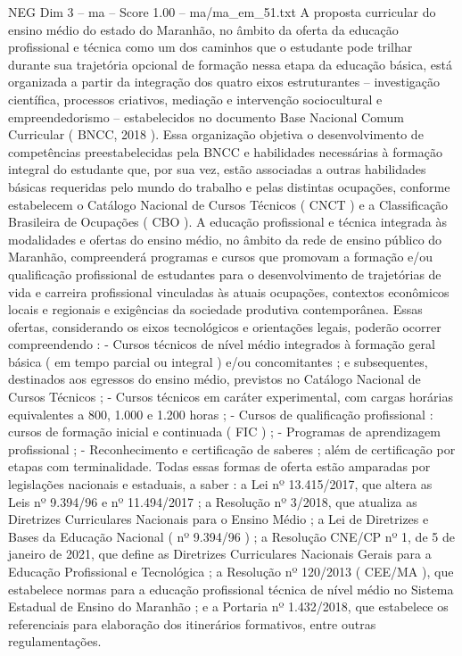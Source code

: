 \begin{textsample}{NEG Dim 3 – ma – Score 1.00 – ma/ma\_em\_51.txt}
A proposta curricular do ensino médio do estado do Maranhão, no âmbito da oferta da educação profissional e técnica como um dos caminhos que o estudante pode trilhar durante sua trajetória opcional de formação nessa etapa da educação básica, está organizada a partir da integração dos quatro eixos estruturantes – investigação científica, processos criativos, mediação e intervenção sociocultural e empreendedorismo – estabelecidos no documento Base Nacional Comum Curricular ( BNCC, 2018 ).
Essa organização objetiva o desenvolvimento de competências preestabelecidas pela BNCC e habilidades necessárias à formação integral do estudante que, por sua vez, estão associadas a outras habilidades básicas requeridas pelo mundo do trabalho e pelas distintas ocupações, conforme estabelecem o Catálogo Nacional de Cursos Técnicos ( CNCT ) e a Classificação Brasileira de Ocupações ( CBO ).
A educação profissional e técnica integrada às modalidades e ofertas do ensino médio, no âmbito da rede de ensino público do Maranhão, compreenderá programas e cursos que promovam a formação e/ou qualificação profissional de estudantes para o desenvolvimento de trajetórias de vida e carreira profissional vinculadas às atuais ocupações, contextos econômicos locais e regionais e exigências da sociedade produtiva contemporânea.
Essas ofertas, considerando os eixos tecnológicos e orientações legais, poderão ocorrer compreendendo : - Cursos técnicos de nível médio integrados à formação geral básica ( em tempo parcial ou integral ) e/ou concomitantes ; e subsequentes, destinados aos egressos do ensino médio, previstos no Catálogo Nacional de Cursos Técnicos ; - Cursos técnicos em caráter experimental, com cargas horárias equivalentes a 800, 1.000 e 1.200 horas ; - Cursos de qualificação profissional : cursos de formação inicial e continuada ( FIC ) ; - Programas de aprendizagem profissional ; - Reconhecimento e certificação de saberes ; além de certificação por etapas com terminalidade.
Todas essas formas de oferta estão amparadas por legislações nacionais e estaduais, a saber : a Lei nº 13.415/2017, que altera as Leis nº 9.394/96 e nº 11.494/2017 ; a Resolução nº 3/2018, que atualiza as Diretrizes Curriculares Nacionais para o Ensino Médio ; a Lei de Diretrizes e Bases da Educação Nacional ( nº 9.394/96 ) ; a Resolução CNE/CP nº 1, de 5 de janeiro de 2021, que define as Diretrizes Curriculares Nacionais Gerais para a Educação Profissional e Tecnológica ; a Resolução nº 120/2013 ( CEE/MA ), que estabelece normas para a educação profissional técnica de nível médio no Sistema Estadual de Ensino do Maranhão ; e a Portaria nº 1.432/2018, que estabelece os referenciais para elaboração dos itinerários formativos, entre outras regulamentações.

\end{textsample}
